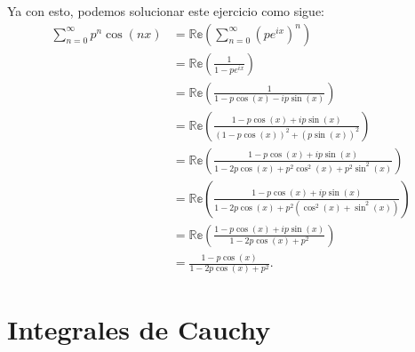 \documentclass{report}
\begin{document}
\begin{enumerate}
Ya con esto, podemos solucionar este ejercicio como sigue:
\begin{align*}
  \sum_{n=0}^{\infty} p^{n}\cos\left( nx \right) &= \mathbb{Re}\left( \sum_{n=0}^{\infty} \left( pe^{ix} \right)^{n} \right) \\
  &= \mathbb{Re}\left( \frac{1}{1-pe^{ix}} \right)  \\
  &= \mathbb{Re}\left( \frac{1}{1-p\cos\left( x \right) - ip\sin\left( x \right) } \right)  \\
  &= \mathbb{Re}\left( \frac{1-p\cos\left( x \right) + ip\sin\left( x \right) }{\left( 1-p\cos\left( x \right) \right)^2 +\left( p\sin\left( x \right)  \right)^2 } \right)  \\
  &= \mathbb{Re}\left( \frac{1-p\cos\left( x \right) + ip\sin\left( x \right) }{1-2p\cos\left( x \right) + p^2\cos^2\left( x \right) + p^2\sin^2\left( x \right) } \right)  \\
  &= \mathbb{Re}\left( \frac{1-p\cos\left( x \right) + ip\sin\left( x \right) }{1 - 2p\cos\left( x \right) + p^2\left( \cos^2\left( x \right) + \sin^2\left( x \right)  \right) } \right)  \\
  &= \mathbb{Re}\left( \frac{1-p\cos\left( x \right) +ip\sin\left( x \right) }{1-2p\cos\left( x \right) +p^2} \right)  \\
  &= \frac{1-p\cos\left( x \right) }{1-2p\cos\left( x \right) + p^2}
.\end{align*}
\end{enumerate}
\chapter{Integrales de Cauchy}
\end{document}
